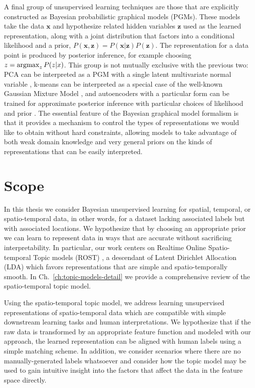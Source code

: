 A final group of unsupervised learning techniques are those that are explicitly constructed as Bayesian probabilistic graphical models (PGMs). These models take the data $\textbf{x}$ and hypothesize related hidden variables $\textbf{z}$ used as the learned representation, along with a joint distribution that factors into a conditional likelihood and a prior, $P(\textbf{x}, \textbf{z}) = P(\textbf{x}|\textbf{z}) P(\textbf{z})$. The representation for a data point is produced by posterior inference, for example choosing $z = \operatorname*{argmax}_z P(z | x)$. This group is not mutually exclusive with the previous two: PCA can be interpreted as a PGM with a single latent multivariate normal variable \citep{Bishop1999}, k-means can be interpreted as a special case of the well-known Gaussian Mixture Model  \citep{BishopCh9}, and autoencoders with a particular form can be trained for approximate posterior inference with particular choices of likelihood and prior \citep{Kingma2014}. The essential feature of the Bayesian graphical model formalism is that it provides a mechanism to control the types of representations we would like to obtain without hard constraints, allowing models to take advantage of both weak domain knowledge and very general priors on the kinds of representations that can be easily interpreted.

\section{Scope}
In this thesis we consider Bayesian unsupervised learning for spatial, temporal, or spatio-temporal data, in other words, for a dataset lacking associated labels but with associated locations. We hypothesize that by choosing an appropriate prior we can learn to represent data in ways that are accurate without sacrificing interpretability. In particular, our work centers on Realtime Online Spatio-temporal Topic models (ROST) \citep{Girdhar2014}, a descendant of Latent Dirichlet Allocation (LDA) \citep{Blei2003} which favors representations that are simple and spatio-temporally smooth. In Ch.~\ref{ch:topic-models-detail} we provide a comprehensive review of the spatio-temporal topic model.

Using the spatio-temporal topic model, we address learning unsupervised representations of spatio-temporal data which are compatible with simple downstream learning tasks and human interpretations. We hypothesize that if the raw data is transformed by an appropriate feature function and modeled with our approach, the learned representation can be aligned with human labels using a simple matching scheme. In addition, we consider scenarios where there are no manually-generated labels whatsoever and consider how the topic model may be used to gain intuitive insight into the factors that affect the data in the feature space directly.

